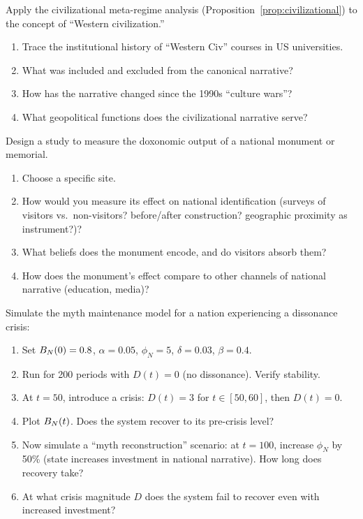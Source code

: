 \begin{exercise}
Apply the civilizational meta-regime analysis (Proposition~\ref{prop:civilizational}) to the concept of ``Western civilization.''
\begin{enumerate}[nosep]
  \item Trace the institutional history of ``Western Civ'' courses in US universities.
  \item What was included and excluded from the canonical narrative?
  \item How has the narrative changed since the 1990s ``culture wars''?
  \item What geopolitical functions does the civilizational narrative serve?
\end{enumerate}
\end{exercise}

\begin{exercise}
Design a study to measure the doxonomic output of a national monument or memorial.
\begin{enumerate}[nosep]
  \item Choose a specific site.
  \item How would you measure its effect on national identification (surveys of visitors vs.\ non-visitors? before/after construction? geographic proximity as instrument?)?
  \item What beliefs does the monument encode, and do visitors absorb them?
  \item How does the monument's effect compare to other channels of national narrative (education, media)?
\end{enumerate}
\end{exercise}

\begin{exercise}[Computational]
Simulate the myth maintenance model for a nation experiencing a dissonance crisis:
\begin{enumerate}[nosep]
  \item Set $B_{N}(0) = 0.8$, $\alpha = 0.05$, $\phi_N = 5$, $\delta = 0.03$, $\beta = 0.4$.
  \item Run for 200 periods with $D(t) = 0$ (no dissonance). Verify stability.
  \item At $t = 50$, introduce a crisis: $D(t) = 3$ for $t \in [50, 60]$, then $D(t) = 0$.
  \item Plot $B_{N}(t)$. Does the system recover to its pre-crisis level?
  \item Now simulate a ``myth reconstruction'' scenario: at $t = 100$, increase $\phi_N$ by 50\% (state increases investment in national narrative). How long does recovery take?
  \item At what crisis magnitude $D$ does the system fail to recover even with increased investment?
\end{enumerate}
\end{exercise}
